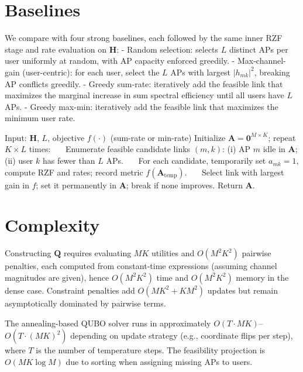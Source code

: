 {\section{Baselines}
We compare with four strong baselines, each followed by the same inner RZF stage and rate evaluation on $\mathbf{H}$:
- Random selection: selects $L$ distinct APs per user uniformly at random, with AP capacity enforced greedily.
- Max-channel-gain (user-centric): for each user, select the $L$ APs with largest $|h_{mk}|^2$, breaking AP conflicts greedily.
- Greedy sum-rate: iteratively add the feasible link that maximizes the marginal increase in sum spectral efficiency until all users have $L$ APs.
- Greedy max-min: iteratively add the feasible link that maximizes the minimum user rate.

\begin{algorithm}[htbp]
\caption{Greedy Sum-Rate and Greedy Max-Min (Selection Only)}
\begin{algorithmic}[1]
\State Input: $\mathbf{H}$, $L$, objective $f(\cdot)$ (sum-rate or min-rate)
\State Initialize $\mathbf{A}=\mathbf{0}^{M\times K}$; repeat $K\!\times\!L$ times:
\State ~~~Enumerate feasible candidate links $(m,k)$: (i) AP $m$ idle in $\mathbf{A}$; (ii) user $k$ has fewer than $L$ APs.
\State ~~~For each candidate, temporarily set $a_{mk}\!=\!1$, compute RZF and rates; record metric $f(\mathbf{A}_{\text{temp}})$.
\State ~~~Select link with largest gain in $f$; set it permanently in $\mathbf{A}$; break if none improves.
\State Return $\mathbf{A}$.
\end{algorithmic}
\end{algorithm}

\section{Complexity}
Constructing $\mathbf{Q}$ requires evaluating $MK$ utilities and $O(M^2K^2)$ pairwise penalties, each computed from constant-time expressions (assuming channel magnitudes are given), hence $O(M^2K^2)$ time and $O(M^2K^2)$ memory in the dense case. Constraint penalties add $O(MK^2+KM^2)$ updates but remain asymptotically dominated by pairwise terms.

The annealing-based QUBO solver runs in approximately $O(T\cdot MK)$–$O(T\cdot (MK)^2)$ depending on update strategy (e.g., coordinate flips per step), where $T$ is the number of temperature steps. The feasibility projection is $O(MK\log M)$ due to sorting when assigning missing APs to users.

}
